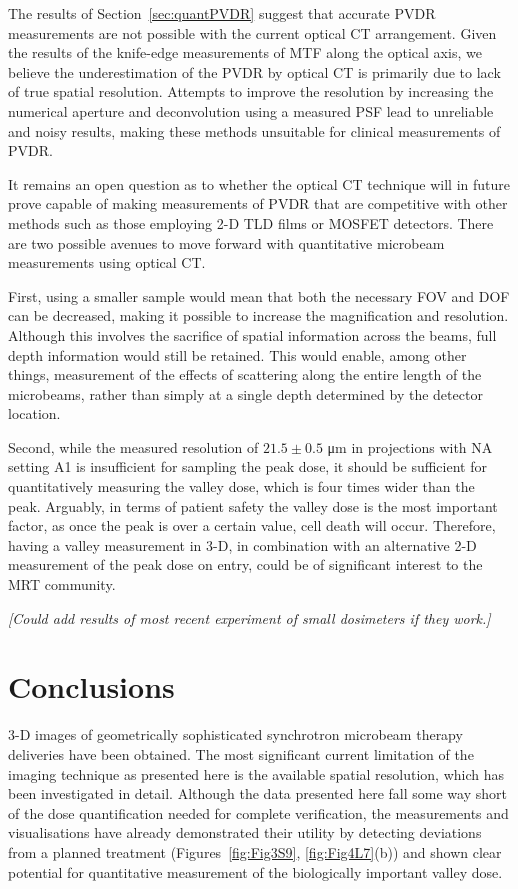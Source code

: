 	
	The results of Section~\ref{sec:quantPVDR} suggest that accurate PVDR measurements are not possible with the current optical CT arrangement. Given the results of the knife-edge measurements of MTF along the optical axis, we believe the underestimation of the PVDR by optical CT is primarily due to lack of true spatial resolution. Attempts to improve the resolution by increasing the numerical aperture and deconvolution using a measured PSF lead to unreliable and noisy results, making these methods unsuitable for clinical measurements of PVDR.   
	
	It remains an open question as to whether the optical CT technique will in future prove capable of making measurements of PVDR that are competitive with other methods such as those employing 2-D TLD films or MOSFET detectors. There are two possible avenues to move forward with quantitative microbeam measurements using optical CT. 
	
	First, using a smaller sample would mean that both the necessary FOV and DOF can be decreased, making it possible to increase the magnification and resolution. Although this involves the sacrifice of spatial information across the beams, full depth information would still be retained. This would enable, among other things, measurement of the effects of scattering along the entire length of the microbeams, rather than simply at a single depth determined by the detector location. 
	
	Second, while the measured resolution of $21.5 \pm 0.5$ \si{\um} in projections with NA setting A1 is insufficient for sampling the peak dose, it should be sufficient for quantitatively measuring the valley dose, which is four times wider than the peak. Arguably, in terms of patient safety the valley dose is the most important factor, as once the peak is over a certain value, cell death will occur. Therefore, having a valley measurement in 3-D, in combination with an alternative 2-D measurement of the peak dose on entry, could be of significant interest to the MRT community.
	
	\textit{[Could add results of most recent experiment of small dosimeters if they work.]}
	
	\section{Conclusions}
	3-D images of geometrically sophisticated synchrotron microbeam therapy deliveries have been obtained. The most significant current limitation of the imaging technique as presented here is the available spatial resolution, which has been investigated in detail. Although the data presented here fall some way short of the dose quantification needed for complete verification, the measurements and visualisations have already demonstrated their utility by detecting deviations from a planned treatment (Figures~\ref{fig:Fig3S9}, \ref{fig:Fig4L7}(b)) and shown clear potential for quantitative measurement of the biologically important valley dose.
	
	
	
	
	
